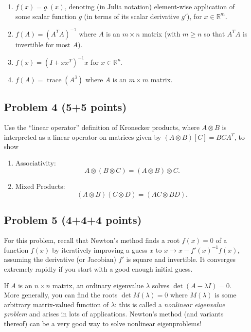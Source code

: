\documentclass[10pt,oneside]{article}
\newcommand{\tr}{\operatorname{trace}}
\begin{document}
\begin{enumerate}

\item $f(x) = g.(x)$, denoting (in Julia notation) element-wise application of some scalar function $g$ (in terms of its scalar derivative $g'$), for $x \in \mathbb{R}^m$.

\item $f(A) = (A^T A)^{-1}$ where $A$ is an $m \times n$ matrix (with $m \ge n$ so that $A^T A$ is invertible for most $A$).

\item $f(x) = (I + x x^T)^{-1} x$ for $x \in \mathbb{R}^n$.

\item $f(A) = \tr(A^3)$ where $A$ is an $m \times m$ matrix.

\end{enumerate}
 
\subsection*{Problem 4 (5+5 points)}

Use the ``linear operator'' definition of Kronecker products, where $A \otimes B$ is interpreted as a linear operator on matrices given by $(A \otimes B)[C] = BCA^T$, to show

\begin{enumerate}

\item Associativity:
$$A \otimes (B \otimes C) =
(A \otimes B) \otimes C.$$

\item Mixed Products:
$$(A \otimes B)(C \otimes D) =
(AC \otimes BD).$$


 \end{enumerate}
\subsection*{Problem 5 (4+4+4 points)}

For this problem, recall that Newton's method finds a root $f(x)=0$ of a function $f(x)$ by iteratively improving a guess $x$ to $x \to x - f'(x)^{-1} f(x)$, assuming the derivative (or Jacobian) $f'$ is square and invertible.  It converges extremely rapidly if you start with a good enough initial guess.

If $A$ is an $n \times n$ matrix, an ordinary eigenvalue $\lambda$ solves $\det(A - \lambda I) = 0$.   More generally, you can find the roots $\det M(\lambda) = 0$ where $M(\lambda)$ is some arbitrary matrix-valued function of $\lambda$: this is called a \emph{nonlinear eigenvalue problem} and arises in lots of applications.  Newton's method (and variants thereof) can be a very good way to solve nonlinear eigenproblems!
\end{document}
